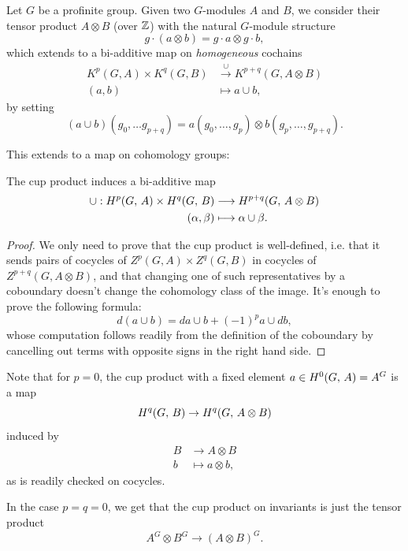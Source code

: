 \documentclass[a4paper, oneside]{memoir}
\begin{document}
Let $G$ be a profinite group. Given two $G$-modules $A$ and $B$, we consider their tensor product $A\otimes B$ (over $\mathbb{Z}$) with the natural $G$-module structure
\[
    g\cdot (a\otimes b)=g\cdot a\otimes g\cdot b,
\]
which extends to a bi-additive map on \textit{homogeneous} cochains
\begin{align*}
    K^p(G,A)\times K^q(G,B) & \overset{\cup}{\longrightarrow} K^{p+q}(G,A\otimes B) \\
    (a,b)                   & \mapsto a\cup b,
\end{align*}
by setting
\[
    (a\cup b)(g_0,\dots g_{p+q})=a(g_0,\dots,g_p)\otimes b(g_p,\dots,g_{p+q}).
\]

This extends to a map on cohomology groups:

\begin{theorem}\label{thm:Cup}
    The cup product induces a bi-additive map
    \begin{align*}
        \cup: H^{p}( G, \, A )\times H^{q}( G, \, B ) & \longrightarrow H^{p+q}( G, \, A\otimes B ) \\
        (\alpha,\beta)                     & \longmapsto \alpha\cup\beta.
    \end{align*}
\end{theorem}

\begin{proof}
    We only need to prove that the cup product is well-defined, i.e. that it sends pairs of cocycles of $Z^p(G,A)\times Z^q(G,B)$ in cocycles of $Z^{p+q}(G,A\otimes B)$, and that changing one of such representatives by a coboundary doesn't change the cohomology class of the image.
    It's enough to prove the following formula:
    \begin{equation}\label{eq:DiffCup}
        d(a\cup b)=da\cup b+(-1)^pa\cup d b,
    \end{equation}
    whose computation follows readily from the definition of the coboundary by cancelling out terms with opposite signs in the right hand side.
\end{proof}

\begin{remark}\label{rm:Cup0n}
    Note that for $p=0$, the cup product with a fixed element $a\in H^{0}( G, \, A )=A^G$ is a map
    \[
        H^{q}( G, \, B )\to H^{q}( G, \, A\otimes B )
    \]
    induced by
    \begin{align*}
        B & \longrightarrow A\otimes B \\
        b & \longmapsto a\otimes b,
    \end{align*}
    as is readily checked on cocycles.

    In the case $p=q=0$, we get that the cup product on invariants is just the tensor product $$A^G\otimes B^G\to (A\otimes B)^G.$$
\end{remark}
\end{document}
